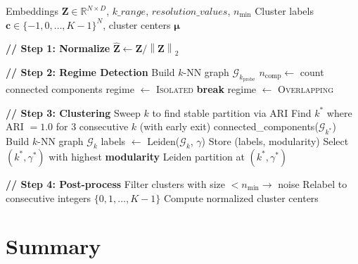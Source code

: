 \documentclass[11pt,a4paper]{article}
\newcommand{\vect}[1]{\mathbf{#1}}
\newcommand{\mat}[1]{\mathbf{#1}}
\newcommand{\set}[1]{\mathcal{#1}}
\newcommand{\norm}[1]{\left\|#1\right\|}
\newcommand{\R}{\mathbb{R}}
\begin{document}
\begin{algorithm}[H]
\caption{Adaptive Graph-Based Trajectory Clustering}
\begin{algorithmic}[1]
\Require Embeddings $\mat{Z} \in \R^{N \times D}$, $k\_range$, $resolution\_values$, $n_{\min}$
\Ensure Cluster labels $\vect{c} \in \{-1, 0, \ldots, K-1\}^N$, cluster centers $\boldsymbol{\mu}$

\State \textbf{// Step 1: Normalize}
\State $\hat{\mat{Z}} \gets \mat{Z} / \norm{\mat{Z}}_2$

\State \textbf{// Step 2: Regime Detection}
    \State Build $k$-NN graph $\set{G}_{k_{\text{probe}}}$
    \State $n_{\text{comp}} \gets$ count connected components
        \State regime $\gets$ \textsc{Isolated}
        \State \textbf{break}
    \EndIf
\EndFor
{}
    \State regime $\gets$ \textsc{Overlapping}
\EndIf

\State \textbf{// Step 3: Clustering}
    \State Sweep $k$ to find stable partition via ARI
    \State Find $k^*$ where ARI $= 1.0$ for 3 consecutive $k$ (with early exit)
    \State \Return connected\_components($\set{G}_{k^*}$)
\Else
        \State Build $k$-NN graph $\set{G}_k$
        \State labels $\gets$ Leiden($\set{G}_k$, $\gamma$)
        \State Store (labels, modularity)
    \EndFor
    \State Select $(k^*, \gamma^*)$ with highest \textbf{modularity}
    \State \Return Leiden partition at $(k^*, \gamma^*)$
\EndIf

\State \textbf{// Step 4: Post-process}
\State Filter clusters with size $< n_{\min} \rightarrow$ noise
\State Relabel to consecutive integers $\{0, 1, \ldots, K-1\}$
\State Compute normalized cluster centers
\end{algorithmic}
\end{algorithm}

\newpage
\section{Summary}
\end{document}
